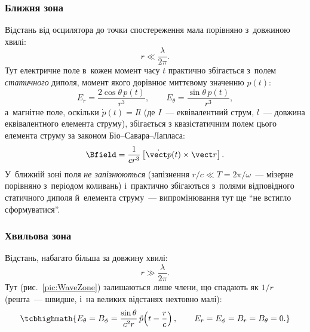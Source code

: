 \subsubsection*{Ближня зона}
Відстань від осцилятора до точки спостереження мала порівняно
з~довжиною хвилі:
\begin{equation}\label{eq:NearZoneCondition}
	r \ll \frac\lambda{2\pi}.
\end{equation}
Тут електричне поле в~кожен момент часу $t$ практично збігається з~полем
\emph{статичного} диполя, момент якого дорівнює миттєвому значенню $p(t)$:
\begin{equation}\label{eq:NearZoneE}
	E_r = \frac{2\cos\theta\, p(t)}{r^3}, \qquad E_\theta = \frac{\sin\theta\, p(t)}{r^3},
\end{equation}
а~магнітне поле, оскільки $\dot p(t) = Il$ (де $I$~--- еквівалентний струм, $l$~---
довжина еквівалентного елемента струму), збігається з квазістатичним полем цього елемента
струму за законом Біо--Савара--Лапласа:
\begin{equation}\label{eq:NearZoneB}
	\Bfield = \frac1{cr^3}\left[\dot{\vect p}(t)\times\vect r\right].
\end{equation}
У~ближній зоні поля \emph{не запізнюються} (запізнення $r/c \ll T = 2\pi/\omega$~---
мізерне порівняно з~періодом коливань) і~практично збігаються з~полями відповідного
статичного диполя й~елемента струму~--- випромінювання тут ще \enquote{не встигло
сформуватися}.



\subsubsection*{Хвильова зона}
Відстань, набагато більша за довжину хвилі:
\begin{equation}\label{eq:WaveZoneCondition}
	r \gg \frac\lambda{2\pi}.
\end{equation}
Тут (рис.~\ref{pic:WaveZone}) залишаються лише члени, що спадають як $1/r$ (решта~---
швидше, і~на великих відстанях нехтовно малі):
\begin{equation}\label{eq:WaveZoneFields}
	\tcbhighmath{ E_\theta = B_\phi = \frac{\sin\theta}{c^2r}\,\ddot{p}\!\left(t-\frac{r}c\right), \qquad E_r=E_\phi=B_r=B_\theta=0. }
\end{equation}

